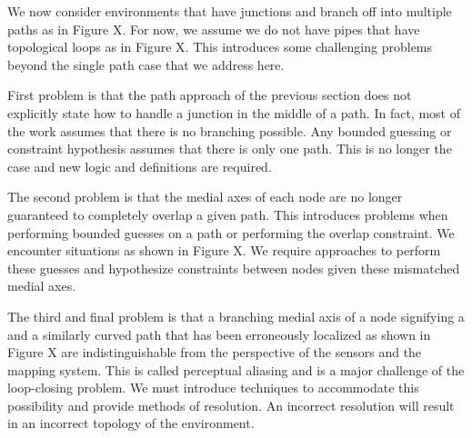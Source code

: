 
We now consider environments that have junctions and branch off into multiple paths as in Figure X.  For now, we assume we do not have pipes that have topological loops as in Figure X.  This introduces some challenging problems beyond the single path case that we address here.

First problem is that the path approach of the previous section does not explicitly state how to handle a junction in the middle of a path.  In fact, most of the work assumes that there is no branching possible.  Any bounded guessing or constraint hypothesis assumes that there is only one path.  This is no longer the case and new logic and definitions are required.

The second problem is that the medial axes of each node are no longer guaranteed to completely overlap a given path.  This introduces problems when performing bounded guesses on a path or performing the overlap constraint.  We encounter situations as shown in Figure X.  We require approaches to perform these guesses and hypothesize constraints between nodes given these mismatched medial axes.

The third and final problem is that a branching medial axis of a node signifying a and a similarly curved path that has been erroneously localized as shown in Figure X are indistinguishable from the perspective of the sensors and the mapping system.  This is called perceptual aliasing and is a major challenge of the loop-closing problem.  We must introduce techniques to accommodate this possibility and provide methods of resolution.  An incorrect resolution will result in an incorrect topology of the environment.



